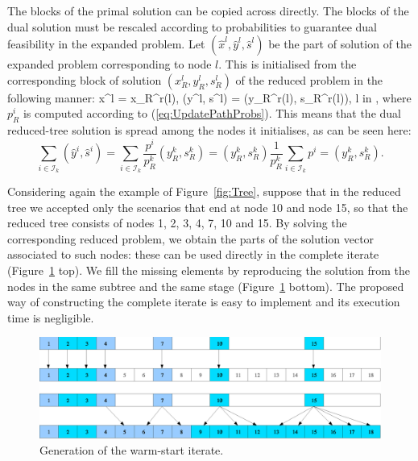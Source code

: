 The blocks of the primal solution can be copied across directly.
The blocks of the dual solution must be rescaled according to probabilities
to guarantee dual feasibility in the expanded problem.
Let $(\hat x^{l}, \hat y^{l}, \hat s^{l})$ be the part of solution
of the expanded problem corresponding to node $l$. This is initialised
from the corresponding block of solution $(x_R^{l}, y_R^{l},  s_R^{l})$
of the reduced problem in the following manner:
\be  \label{eq:WarmstartSolution}
  \hat x^{l} = x_R^{r(l)}, \qquad 
 (\hat y^{l}, \hat s^{l}) =  (y_R^{r(l)}, s_R^{r(l)}),
  \qquad l in \Ctree,
\ee
where $p^i_R$ is computed according to (\ref{eq:UpdatePathProbs}).
This means that the dual reduced-tree solution is spread among the
nodes it initialises, as can be seen here:
\[
   \sum_{i \in \mathcal{I}_k} (\hat y^i, \hat s^i)
  = \sum_{i \in \mathcal{I}_k} \frac{p^i}{p^k_R} (y^k_R, s^k_R)
  = (y^k_R, s^k_R) \frac{1}{p^k_R} \sum_{i \in \mathcal{I}_k} p^i 
  = (y^k_R, s^k_R).
\]

Considering again the example of Figure~\ref{fig:Tree}, suppose that 
in the reduced tree we accepted only the scenarios that end at 
node 10 and node 15, so that the reduced tree consists of nodes 
1, 2, 3, 4, 7, 10 and 15. By solving the corresponding reduced problem, 
we obtain the parts of the solution vector associated to such 
nodes: these can be used directly in the complete iterate
(Figure~\ref{fig:Solution} top). 
We fill the missing elements 
by reproducing the solution from the nodes in the same subtree 
and the same stage (Figure~\ref{fig:Solution} bottom).
The proposed way of constructing the complete iterate is easy to
implement and its execution time is negligible.
%
\begin{figure}[ht]
  \begin{center}
    \includegraphics[scale=.51]{figures/solution.eps}
    \caption{Generation of the warm-start iterate.}
    \label{fig:Solution}
  \end{center}
  \vspace{-3ex}
\end{figure}

